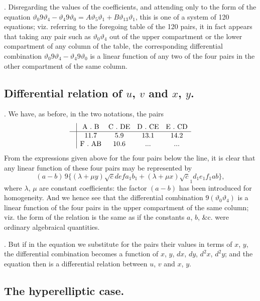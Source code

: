 \documentclass[11pt,a4paper]{book}
\begin{document}
\newpage
\setcounter{page}{563}

. Disregarding the values of the coefficients, and attending only to the form of the equation $\vartheta_0 9\vartheta_4 - \vartheta_4 9\vartheta_0 = A \vartheta_5 \vartheta_1 + B \vartheta_{13} \vartheta_1$, this is one of a system of 120 equations; viz. referring to the foregoing table of the 120 pairs, it in fact appears that taking any pair such as $\vartheta_0 \vartheta_4$ out of the upper compartment or the lower compartment of any column of the table, the corresponding differential combination $\vartheta_0 9\vartheta_4 - \vartheta_4 9\vartheta_0$ is a linear function of any two of the four pairs in the other compartment of the same column.

\subsection*{Differential relation of $u$, $v$ and $x$, $y$.}

. We have, as before, in the two notations, the pairs
\[
\begin{array}{c|cccc}
& \text{A . B} & \text{C . DE} & \text{D . CE} & \text{E . CD} \\
\hline
& 11 . 7 & 5 . 9 & 13 . 1 & 14 . 2 \\
& \text{F . AB} & 10 . 6 & \text{...} & \text{...}
\end{array}
\]
From the expressions given above for the four pairs below the line, it is clear that any linear function of these four pairs may be represented by
\[
(a - b)\, 9\{(\lambda + \mu y)\surd cdef a_1 b_1 + (\lambda + \mu x)\surd c_1 d_1 e_1 f_1 ab\},
\]
where $\lambda$, $\mu$ are constant coefficients: the factor $(a - b)$ has been introduced for homogeneity. And we hence see that the differential combination $9(\vartheta_0 \vartheta_4)$ is a linear function of the four pairs in the upper compartment of the same column; viz. the form of the relation is the same as if the constants $a$, $b$, \&c. were ordinary algebraical quantities.

\newpage
\setcounter{page}{564}

. But if in the equation we substitute for the pairs their values in terms of $x$, $y$, the differential combination becomes a function of $x$, $y$, $dx$, $dy$, $d^2x$, $d^2y$; and the equation then is a differential relation between $u$, $v$ and $x$, $y$.

\subsection*{The hyperelliptic case.}
\end{document}
